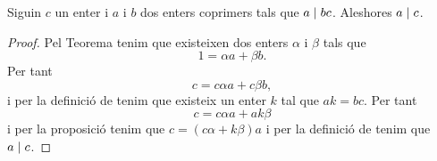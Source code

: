 \documentclass[../../Main.tex]{subfiles}
\begin{document}
	\begin{proposition}
		\label{prop:un enter que divideix al producte de dos, on un n'és coprimer, divideix a l'altre}
		Siguin \(c\) un enter i \(a\) i \(b\) dos enters coprimers tals que \(a\mathrel{|} bc\). Aleshores \(a\mathrel{|} c\).
		\begin{proof}
			Pel Teorema  tenim que existeixen dos enters \(\alpha\) i \(\beta\) tals que
			\[1=\alpha a+\beta b.\]
			Per tant
			\[c=c\alpha a+c\beta b,\]
			i per la definició de  tenim que existeix un enter \(k\) tal que \(ak=bc\). Per tant
			\[c=c\alpha a+ak\beta\]
			i per la proposició  tenim que \(c=(c\alpha+k\beta)a\) i per la definició de  tenim que \(a\mathrel{|} c\).
		\end{proof}
	\end{proposition}
\end{document}
